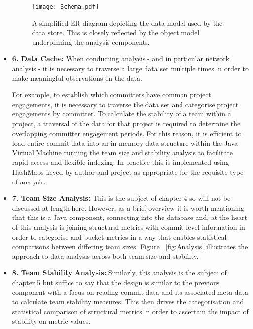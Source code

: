\begin{itemize}
 \begin{figure}[htbp!] 
 \centering    
 \texttt{[image: Schema.pdf]}
 \caption[A simplified ER diagram depicting the logical data model used by the data store.]{A simplified ER diagram depicting the data model used by the data store. This is closely reflected by the object model underpinning the analysis components.}
 \label{fig:Schema}
 \end{figure}

\item \textbf{6. Data Cache:}
When conducting analysis - and in particular network analysis - it is necessary to traverse a large data set multiple times in order to make meaningful observations on the data.

For example, to establish which committers have common project engagements, it is necessary to traverse the data set and categorise project engagements by committer. To calculate the stability of a team within a project, a traversal of the data for that project is required to determine the overlapping committer engagement periods. For this reason, it is efficient to load entire commit data into an in-memory data structure within the Java Virtual Machine running the team size and stability analysis to facilitate rapid access and flexible indexing. In practice this is implemented using HashMaps keyed by author and project as appropriate for the requisite type of analysis. 

\item \textbf{7. Team Size Analysis:} This is the subject of chapter 4 so will not be discussed at length here. However, as a brief overview it is worth mentioning that this is a Java component, connecting into the database and, at the heart of this analysis is joining structural metrics with commit level information in order to categorise and bucket metrics in a way that enables statistical comparisons between differing team sizes. Figure ~\ref{fig:Analysis} illustrates the approach to data analysis across both team size and stability.

\item \textbf{8. Team Stability Analysis:} Similarly, this analysis is the subject of chapter 5 but suffice to say that the design is similar to the previous component with a focus on reading commit data and its associated meta-data to calculate team stability measures. This then drives the categorisation and statistical comparison of structural metrics in order to ascertain the impact of stability on metric values.
\end{itemize}

